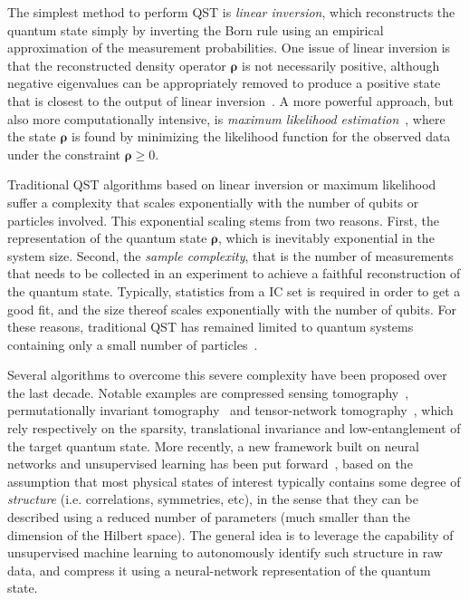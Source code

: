 \documentclass[twocolumn,english,reprint,superscriptaddress,longbibliography,pra]{revtex4-1}
\begin{document}
The simplest method to perform QST is {\it linear inversion}, which reconstructs the quantum state simply by inverting the Born rule using an empirical approximation of the measurement probabilities. One issue of linear inversion is that the reconstructed density operator $\bm{\rho}$ is not necessarily positive, although negative eigenvalues can be appropriately removed to produce a positive state that is closest to the output of linear inversion~\cite{PhysRevLett.108.070502}. A more powerful approach, but also more computationally intensive, is {\it maximum likelihood estimation}~\cite{PhysRevA.55.R1561,PhysRevA.63.040303,PhysRevA.64.052312}, where the state $\bm{\rho}$ is found by minimizing the likelihood function for the observed data under the constraint $\bm{\rho}\ge0$. 

Traditional QST algorithms based on linear inversion or maximum likelihood suffer a complexity that scales exponentially with the number of qubits or particles involved. This exponential scaling stems from two reasons. First, the representation of the quantum state $\bm{\rho}$, which is inevitably exponential in the system size. Second, the {\it sample complexity}, that is the number of measurements that needs to be collected in an experiment to achieve a faithful reconstruction of the quantum state. Typically, statistics from a IC set is required in order to get a good fit, and the size thereof scales exponentially with the number of qubits. For these reasons, traditional QST has remained limited to quantum systems containing only a small number of particles~\cite{haffner_scalable_2005}. 

Several algorithms to overcome this severe complexity have been proposed over the last decade. Notable examples are compressed sensing tomography~\cite{PhysRevLett.105.150401,Flammia_2012,PhysRevLett.106.100401,riofrio_experimental_2017}, permutationally invariant tomography~\cite{PhysRevLett.105.250403,Moroder_2012} and tensor-network tomography~\cite{cramer2009efficient,MPOtomo,Lanyon2017,LeiWang2020}, which rely respectively on the sparsity, translational invariance and low-entanglement of the target quantum state. More recently, a new framework built on neural networks and unsupervised learning has been put forward~\cite{torlai_Tomo}, based on the assumption that most physical states of interest typically contains some degree of {\it structure} (i.e. correlations, symmetries, etc), in the sense that they can be described using a reduced number of parameters (much smaller than the dimension of the Hilbert space). The general idea is to leverage the capability of unsupervised machine learning to autonomously identify such structure in raw data, and compress it using a neural-network representation of the quantum state. 
\end{document}
